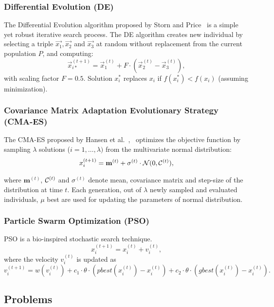 \documentclass{sig-alternate}
\begin{document}
    \subsubsection{Differential Evolution (DE)}
    The Differential Evolution algorithm proposed by Storn and Price~\cite{storn1997differential} is a simple yet robust iterative search process.
    The DE algorithm creates new individual by selecting a triple $\vec{x_1}, \vec{x_2}$ and $\vec{x_3}$ at random without replacement from the current population $P$, and computing:
    $$\vec{x}_{i*}^{(t+1)} = \vec{x}_1^{(t)} + F \cdot (\vec{x}_2^{(t)} - \vec{x}_3^{(t)}),$$
    with scaling factor $F=0.5$.
    Solution $x_i^*$ replaces $x_i$ if $f(x_i^*) < f(x_i)$ (assuming minimization).

    \subsubsection{Covariance Matrix Adaptation Evolutionary Strategy (CMA-ES)}

    The CMA-ES proposed by Hansen et al.~\cite{hansen2001completely},~\cite{hansen2003reducing} optimizes the objective function by sampling $\lambda$ solutions ($i = 1,\ldots,\lambda)$ from the multivariate normal distribution:
    $$x_i^{(t + 1)} = \textbf{m}^{(t)} + \sigma^{(t)} \cdot {\cal N}(0, {\cal C}^{(t)}),$$

    where $\textbf{m}^{(t)}$, ${\cal C}^{(t)}$ and $\sigma^{(t)}$ denote mean, covariance matrix and step-size of the distribution at time $t$.
    Each generation, out of $\lambda$ newly sampled and evaluated individuals, $\mu$ best are used for updating the parameters of normal distribution.

    \subsubsection{Particle Swarm Optimization (PSO)}

    PSO is a bio-inspired stochastic search technique.
    $$
        x_i^{(t+1)} = x_i^{(t)} + v_i^{(t)},
    $$
    where the velocity $v_i^{(t)}$ is updated as
    $$
    v_i^{(t+1)} = w(v_i^{(t)}) + c_1 \cdot \theta\cdot(pbest(x_i^{(t)}) - x_i^{(t)}) + c_2 \cdot \theta\cdot(gbest(x_i^{(t)}) - x_i^{(t)}).
    $$


\subsection{Problems}
\end{document}
